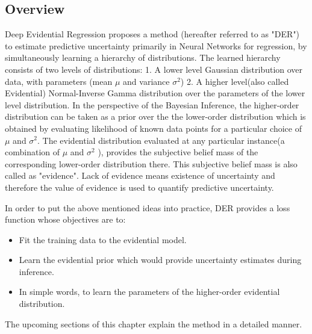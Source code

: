 	\subsection{Overview}\label{sec_overview_der}  
	Deep Evidential Regression proposes a method (hereafter referred to as "DER") to estimate predictive uncertainty primarily in Neural Networks for regression, by simultaneously learning a hierarchy of distributions. The learned hierarchy consists of two levels of distributions: 1. A lower level Gaussian distribution over data, with parameters (mean $\mu$ and variance $\sigma^2$) 2. A higher level(also called Evidential) Normal-Inverse Gamma distribution over the parameters of the lower level distribution. In the perspective of the Bayesian Inference, the higher-order distribution can be taken as a prior over the the lower-order distribution which is obtained by evaluating likelihood of known data points for a particular choice of $\mu$ and $\sigma^2$. The evidential distribution evaluated at any particular instance(a combination of $\mu$ and $\sigma^2$  ), provides the subjective belief mass of the corresponding lower-order distribution there. This subjective belief mass is also called as "evidence". Lack of evidence means existence of uncertainty and therefore the value of evidence is used to quantify predictive uncertainty. 
	
	In order to put the above mentioned ideas into practice, DER provides a loss function whose objectives are to:
	\begin{itemize}
		\item Fit the training data to the evidential model.
		\item Learn the evidential prior which would provide uncertainty estimates during inference.
		\item In simple words, to learn the parameters of the higher-order evidential distribution.    
	\end{itemize} 
	The upcoming sections of this chapter explain the method in a detailed manner.
	
